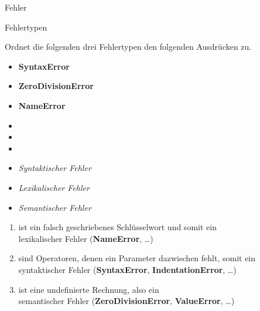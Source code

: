 \begin{task}[points=auto]{Fehler}
    \begin{subtask*}[points=0]{Fehlertypen }

        Ordnet die folgenden drei Fehlertypen den folgenden Ausdrücken zu.
        \begin{multicols}{3}
            \begin{itemize}
                \item[] \textbf{SyntaxError}
                \item[] \textbf{ZeroDivisionError}
                \item[] \textbf{NameError}
            \end{itemize}
            \begin{itemize}
                \item[] 
                \item[] 
                \item[] 
            \end{itemize}
            \begin{itemize}
                \item[] \textit{Syntaktischer Fehler}
                \item[] \textit{Lexikalischer Fehler}
                \item[] \textit{Semantischer Fehler}
            \end{itemize}
        \end{multicols}

        \begin{solution}
            \begin{enumerate}
                \item {} ist ein falsch geschriebenes Schlüsselwort und
                      somit ein \\ lexikalischer Fehler (\textbf{NameError}, \dots)
                \item {} sind Operatoren, denen ein Parameter dazwischen
                      fehlt, somit ein
                      \\ syntaktischer Fehler (\textbf{SyntaxError}, \textbf{IndentationError}, \dots)
                \item {} ist eine undefinierte Rechnung, also ein
                      \\ semantischer Fehler (\textbf{ZeroDivisionError}, \textbf{ValueError}, \dots)
            \end{enumerate}


\end{solution}
\end{subtask*}
\end{task}
